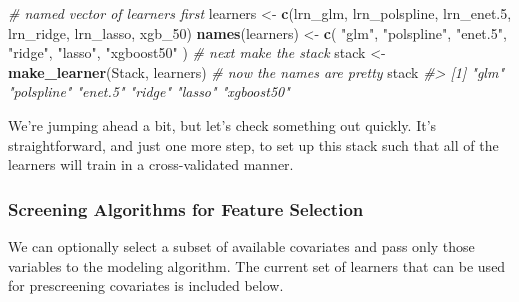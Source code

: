 \documentclass[12pt, krantz2,]{book}
\newenvironment{Shaded}{\begin{snugshade}}{\end{snugshade}}
\newcommand{\CommentTok}[1]{\textcolor[rgb]{0.56,0.35,0.01}{\textit{#1}}}
\newcommand{\DecValTok}[1]{\textcolor[rgb]{0.00,0.00,0.81}{#1}}
\newcommand{\FloatTok}[1]{\textcolor[rgb]{0.00,0.00,0.81}{#1}}
\newcommand{\KeywordTok}[1]{\textcolor[rgb]{0.13,0.29,0.53}{\textbf{#1}}}
\newcommand{\NormalTok}[1]{#1}
\newcommand{\OperatorTok}[1]{\textcolor[rgb]{0.81,0.36,0.00}{\textbf{#1}}}
\newcommand{\StringTok}[1]{\textcolor[rgb]{0.31,0.60,0.02}{#1}}
\theoremstyle{definition}
\theoremstyle{definition}
\theoremstyle{definition}
\newcommand{\1}{\mathbbm{1}}
\begin{document}
\begin{Shaded}
\begin{Highlighting}[]
\CommentTok{# named vector of learners first}
\NormalTok{learners <-}\StringTok{ }\KeywordTok{c}\NormalTok{(lrn_glm, lrn_polspline, lrn_enet}\FloatTok{.5}\NormalTok{, lrn_ridge, lrn_lasso, xgb_}\DecValTok{50}\NormalTok{)}
\KeywordTok{names}\NormalTok{(learners) <-}\StringTok{ }\KeywordTok{c}\NormalTok{(}
  \StringTok{"glm"}\NormalTok{, }\StringTok{"polspline"}\NormalTok{, }\StringTok{"enet.5"}\NormalTok{, }\StringTok{"ridge"}\NormalTok{, }\StringTok{"lasso"}\NormalTok{, }\StringTok{"xgboost50"}
\NormalTok{)}
\CommentTok{# next make the stack}
\NormalTok{stack <-}\StringTok{ }\KeywordTok{make_learner}\NormalTok{(Stack, learners)}
\CommentTok{# now the names are pretty}
\NormalTok{stack}
\CommentTok{#> [1] "glm"       "polspline" "enet.5"    "ridge"     "lasso"     "xgboost50"}
\end{Highlighting}
\end{Shaded}

We're jumping ahead a bit, but let's check something out quickly. It's
straightforward, and just one more step, to set up this stack such that all of
the learners will train in a cross-validated manner.

\begin{Shaded}
\end{Shaded}

\hypertarget{screening-algorithms-for-feature-selection}{%
\subsubsection*{Screening Algorithms for Feature Selection}\label{screening-algorithms-for-feature-selection}}


We can optionally select a subset of available covariates and pass only those
variables to the modeling algorithm. The current set of learners that can be
used for prescreening covariates is included below.
\end{document}
